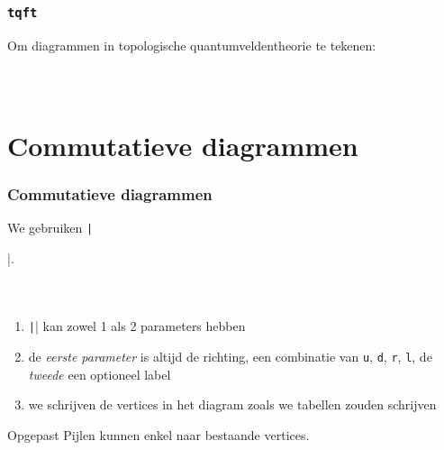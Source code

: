 \documentclass[]{beamer}
\begin{document}
\begin{frame}
  \frametitle{\texttt{tqft}}
  
  Om diagrammen in topologische quantumveldentheorie te tekenen:
  \begin{columns}
    \begin{column}{.6\textwidth}
      \inputminted[fontsize = \scriptsize]{latex}{tikz/tqft.tikz}
    \end{column}
    \begin{column}{.4\textwidth}
      
    \end{column}
  \end{columns}
\end{frame}

\section{Commutatieve diagrammen}

\begin{frame}[fragile]
  \frametitle{Commutatieve diagrammen}

  We gebruiken \texttt|\usepackage{tikz-cd}|.

  \begin{columns}
    \begin{column}{.67\textwidth}
      \inputminted[fontsize = \scriptsize]{latex}{tikz/diagrams/1.tikz}
    \end{column}
    \begin{column}{.33\textwidth}
      
    \end{column}
  \end{columns}
  \begin{enumerate}
    \item\pause \texttt|\arrow| kan zowel 1 als 2 parameters hebben
    \item\pause de \emph{eerste parameter} is altijd de richting, een combinatie van \texttt{u}, \texttt{d}, \texttt{r}, \texttt{l}, de \emph{tweede} een optioneel label
    \item\pause we schrijven de vertices in het diagram zoals we tabellen zouden schrijven
  \end{enumerate}
  \begin{alertblock}{Opgepast}
    \dbend Pijlen kunnen enkel naar bestaande vertices.
  \end{alertblock}
\end{frame}
\end{document}
